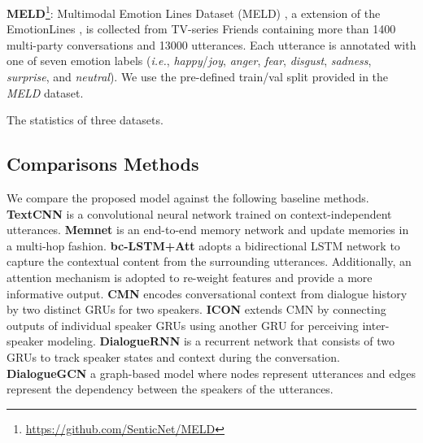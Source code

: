 \documentclass[11pt,a4paper]{article}
\begin{document}
\textbf{MELD}\footnote{\url{https://github.com/SenticNet/MELD}}: 
Multimodal Emotion Lines Dataset (MELD) \cite{DBLP:conf/acl/PoriaHMNCM19}, a extension of the EmotionLines \cite{DBLP:conf/lrec/HsuCKHK18},
     is collected from TV-series Friends containing more than 1400 multi-party conversations and 13000 utterances. Each utterance is annotated with one of seven emotion labels (\textit{i.e.}, {\it happy}/{\it joy}, {\it anger}, {\it fear},  {\it disgust}, {\it sadness}, {\it surprise}, and {\it neutral}).
     We use the pre-defined train/val split provided in the \textit{MELD} dataset.



\begin{table}[t]
\centering  
\resizebox{\linewidth}{!}{^*^*}
    \caption{The statistics of three datasets.}
    \label{tab:datasets}
\end{table}



\subsection{Comparisons Methods}
We compare the proposed model against the following baseline methods.
\textbf{TextCNN} \cite{DBLP:conf/emnlp/Kim14} is a convolutional neural network trained on context-independent utterances.
\textbf{Memnet} \cite{DBLP:conf/nips/SukhbaatarSWF15} is an end-to-end memory network
    and update memories in a multi-hop fashion.    
\textbf{bc-LSTM+Att} \cite{DBLP:conf/acl/PoriaCHMZM17} adopts a bidirectional LSTM network to capture the contextual content from the surrounding utterances. Additionally, an attention mechanism is adopted to re-weight features and provide a more informative output.
\textbf{CMN} \cite{DBLP:conf/naacl/HazarikaPZCMZ18} encodes conversational context from dialogue history by two distinct GRUs for two speakers. 
\textbf{ICON} \cite{DBLP:conf/emnlp/HazarikaPMCZ18} extends CMN by connecting outputs of individual speaker GRUs using another GRU for perceiving inter-speaker modeling.
\textbf{DialogueRNN} \cite{DBLP:conf/aaai/MajumderPHMGC19} is a recurrent network that consists of two GRUs to track speaker states and context during the conversation.
\textbf{DialogueGCN} \cite{DBLP:conf/emnlp/GhosalMPCG19} 
    a graph-based model where nodes represent utterances and edges represent the dependency between the speakers of the utterances.
\end{document}
